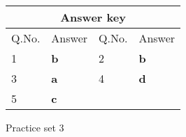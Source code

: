 \setlength\arrayrulewidth{1pt}
\begin{table}[H]
	\centering
	
	\begin{tabular}{|p{1.5cm}|p{1.5cm}||p{1.5cm}|p{1.5cm}|}
		\hline
		\multicolumn{4}{|c|}{\textbf{Answer key}}\\\hline\hline
		\rowcolor{ocrel}Q.No.&Answer&Q.No.&Answer\\\hline
		1&\textbf{b}&2&\textbf{b}\\\hline
		3&\textbf{a}&4&\textbf{d}\\\hline
		5&\textbf{c}&&\\\hline
	\end{tabular}
\end{table}
\newpage
\begin{abox}
	Practice set 3
	\end{abox}
